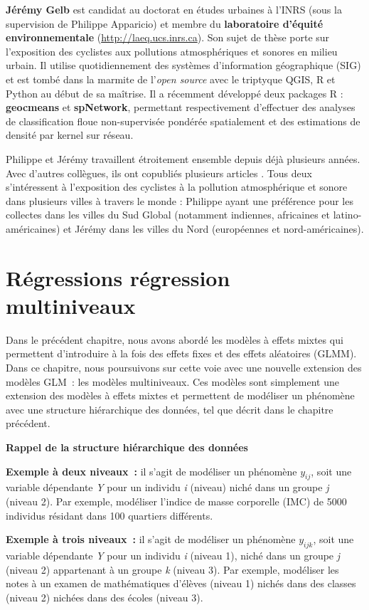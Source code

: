 \documentclass[
  11pt,
  french,
]{book}
\makeatletter
\newenvironment{kframev}{%
\medskip{}
\setlength{\fboxsep}{.8em}
 \def\at@end@of@kframev{}%
 \ifinner\ifhmode%
  \def\at@end@of@kframev{\end{minipage}}%
  \begin{minipage}{\columnwidth}%
 \fi\fi%
 \def\FrameCommand##1{\hskip\@totalleftmargin \hskip-\fboxsep
 \colorbox{shadebluecolor}{##1}\hskip-\fboxsep
     \hskip-\linewidth \hskip-\@totalleftmargin \hskip\columnwidth}%
 \MakeFramed {\advance\hsize-\width
   \@totalleftmargin\z@ \linewidth\hsize
   \@setminipage}}%
 {\par\unskip\endMakeFramed%
 \at@end@of@kframev}
\newenvironment{rmdblock}[1]
  {
  \begin{itemize}
  \renewcommand{\labelitemi}{
    \raisebox{-.7\height}[0pt][0pt]{
      {\setkeys{Gin}{width=3em,keepaspectratio}\texttt{[image: images/\#1]}}
    }
  }
  \setlength{\fboxsep}{1em}
  \begin{kframev}
  \small
  \item
  }
  {
  \end{kframev}
  \end{itemize}
  }
\newenvironment{bloc_notes}
  {\begin{rmdblock}{notes}}
  {\end{rmdblock}}
\makeatother
\begin{document}
\textbf{Jérémy Gelb} est candidat au doctorat en études urbaines à l'INRS (sous la supervision de Philippe Apparicio) et membre du \textbf{laboratoire d'équité environnementale} (\url{http://laeq.ucs.inrs.ca}). Son sujet de thèse porte sur l'exposition des cyclistes aux pollutions atmosphériques et sonores en milieu urbain. Il utilise quotidiennement des systèmes d'information géographique (SIG) et est tombé dans la marmite de l'\emph{open source} avec le triptyque QGIS, R et Python au début de sa maîtrise. Il a récemment développé deux packages R : \textbf{geocmeans} et \textbf{spNetwork}, permettant respectivement d'effectuer des analyses de classification floue non-supervisée pondérée spatialement et des estimations de densité par kernel sur réseau.

Philippe et Jérémy travaillent étroitement ensemble depuis déjà plusieurs années. Avec d'autres collègues, ils ont copubliés plusieurs articles \citep{2020_1, 2020_2, 2020_3, 2019_1, 2019_2, 2019_3, 2020_1, 2020_2, 2018_1, 2017_1, 2016_1}. Tous deux s'intéressent à l'exposition des cyclistes à la pollution atmosphérique et sonore dans plusieurs villes à travers le monde : Philippe ayant une préférence pour les collectes dans les villes du Sud Global (notamment indiennes, africaines et latino-américaines) et Jérémy dans les villes du Nord (européennes et nord-américaines).

\hypertarget{chap08}{%
\chapter{Régressions régression multiniveaux}\label{chap08}}

Dans le précédent chapitre, nous avons abordé les modèles à effets mixtes qui permettent d'introduire à la fois des effets fixes et des effets aléatoires (GLMM). Dans ce chapitre, nous poursuivons sur cette voie avec une nouvelle extension des modèles GLM~: les modèles multiniveaux. Ces modèles sont simplement une extension des modèles à effets mixtes et permettent de modéliser un phénomène avec une structure hiérarchique des données, tel que décrit dans le chapitre précédent.

\begin{bloc_notes}

\textbf{Rappel de la structure hiérarchique des données}

\textbf{Exemple à deux niveaux~:} il s'agit de modéliser un phénomène \(y_{ij}\), soit une variable dépendante \emph{Y} pour un individu \emph{i} (niveau) niché dans un groupe \emph{j} (niveau 2). Par exemple, modéliser l'indice de masse corporelle (IMC) de 5000 individus résidant dans 100 quartiers différents.

\textbf{Exemple à trois niveaux~:} il s'agit de modéliser un phénomène \(y_{ijk}\), soit une variable dépendante \emph{Y} pour un individu \emph{i} (niveau 1), niché dans un groupe \emph{j} (niveau 2) appartenant à un groupe \emph{k} (niveau 3). Par exemple, modéliser les notes à un examen de mathématiques d'élèves (niveau 1) nichés dans des classes (niveau 2) nichées dans des écoles (niveau 3).

\end{bloc_notes}
\end{document}
